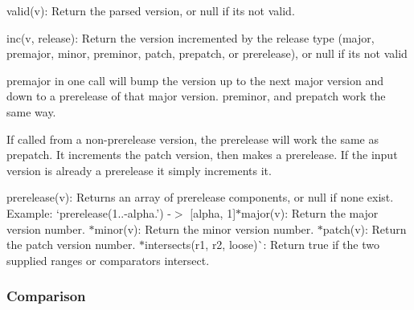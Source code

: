 \begin{DoxyItemize}
\item {\ttfamily valid(v)}\+: Return the parsed version, or null if it\textquotesingle{}s not valid.
\item {\ttfamily inc(v, release)}\+: Return the version incremented by the release type ({\ttfamily major}, {\ttfamily premajor}, {\ttfamily minor}, {\ttfamily preminor}, {\ttfamily patch}, {\ttfamily prepatch}, or {\ttfamily prerelease}), or null if it\textquotesingle{}s not valid
\begin{DoxyItemize}
\item {\ttfamily premajor} in one call will bump the version up to the next major version and down to a prerelease of that major version. {\ttfamily preminor}, and {\ttfamily prepatch} work the same way.
\item If called from a non-\/prerelease version, the {\ttfamily prerelease} will work the same as {\ttfamily prepatch}. It increments the patch version, then makes a prerelease. If the input version is already a prerelease it simply increments it.
\end{DoxyItemize}
\item {\ttfamily prerelease(v)}\+: Returns an array of prerelease components, or null if none exist. Example\+: `prerelease(\textquotesingle{}1..-\/alpha.') -\/$>$ \mbox{[}\textquotesingle{}alpha\textquotesingle{}, 1\mbox{]}{\ttfamily  $\ast$}major(v){\ttfamily \+: Return the major version number. $\ast$}minor(v){\ttfamily \+: Return the minor version number. $\ast$}patch(v){\ttfamily \+: Return the patch version number. $\ast$}intersects(r1, r2, loose)\`{}\+: Return true if the two supplied ranges or comparators intersect.
\end{DoxyItemize}

\subsubsection*{Comparison}


